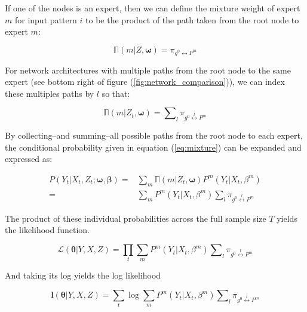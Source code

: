 \documentclass[12pt]{article}
\newcommand{\gateprod}[2]{\pi_{#1 \longleftrightarrow #2}}
\newcommand{\sumgateprod}[3]{\pi_{#1 \overset{#3}{\longleftrightarrow} #2}}
\newcommand{\shortsum}[1]{\sum \nolimits_{#1}}
\newcommand{\expmixwt}[0]{\mathbb{\Pi}}
\begin{document}
If one of the nodes is an expert, then we can define the mixture weight
of expert $m$ for input pattern $i$ to be the product of the path taken
from the root node to expert $m$:

\begin{equation} \label{eq:gpath2}
  \expmixwt(m | Z, \boldsymbol{\omega}) = \gateprod{g^{0}}{P^{m}}
\end{equation}

For network architectures with multiple paths from the root node to
the same expert (see bottom right of figure (\ref{fig:network_comparison})),
we can index these multiples paths by $l$ so that:

\begin{equation} \label{eq:pathsums}
  \expmixwt(m | Z_{t}, \boldsymbol{\omega}) = \shortsum{l} \sumgateprod{g^{0}}{P^{m}}{l} 
\end{equation}


By collecting--and summing--all possible paths from the root node to each
expert, the conditional probability given in equation (\ref{eq:mixture}) can be
expanded and expressed as:

\begin{equation} \label{eq:contribution}
  \begin{split}
    P(Y_{t}|X_{t}, Z_{t}; \boldsymbol{\omega}, \boldsymbol{\beta}) =& \sum_{m} \expmixwt(m | Z_{t}, \boldsymbol{\omega}) P^{m}(Y_{t}|X_{t},\beta^{m}) \\ 
      =& \sum_{m} P^{m}(Y_{t}|X_{t}, \beta^{m}) \shortsum{l} \sumgateprod{g^{0}}{P^{m}}{l}
  \end{split}
\end{equation}

The product of these individual probabilities across the full sample size $T$ yields
the likelihood function.

\begin{equation} \label{eq:likelihood}
  \mathcal{L}(\boldsymbol{\theta}| Y, X, Z) = \prod_{t}\sum_{m}P^{m}(Y_{t}|X_{t}, \beta^{m}) \shortsum{l} \sumgateprod{g^{0}}{P^{m}}{l}
\end{equation}

And taking its log yields the log likelihood

\begin{equation} \label{eq:loglikelihood}
  \boldsymbol{l}(\boldsymbol{\theta}|Y, X, Z) = \sum_{t}\log\sum_{m}P^{m}(Y_{t}|X_{t},\beta^{m}) \shortsum{l} \sumgateprod{g^{0}}{P^{m}}{l}
\end{equation}
\end{document}
